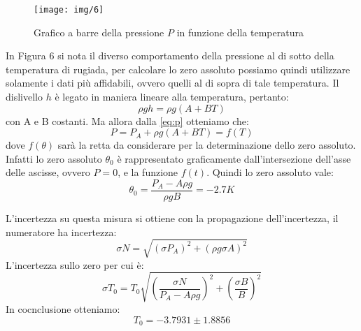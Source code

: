 \begin{figure}[H]
\centering
\texttt{[image: img/6]}
\caption{Grafico a barre della pressione $P$ in funzione della temperatura}
\end{figure}


In Figura 6 si nota il diverso comportamento della pressione al di sotto della temperatura di rugiada, per calcolare lo zero assoluto possiamo quindi utilizzare solamente i dati più affidabili, ovvero quelli al di sopra di tale temperatura.
Il dislivello $h$ è legato in maniera lineare alla temperatura, pertanto:
\begin{equation}
\rho gh = \rho g (A + B T)
\end{equation}
con A e B costanti.
Ma allora dalla \eqref{eq:p} otteniamo che:
\begin{equation}
P = P_A + \rho g (A + B T) = f (T)
\end{equation}
dove $f(\theta)$ sarà la retta da considerare per la determinazione dello zero assoluto.
Infatti lo zero assoluto $\theta_0$ è rappresentato graficamente dall'intersezione dell'asse delle ascisse, ovvero $P = 0$, e la funzione $f(t)$.
Quindi lo zero assoluto vale: 
\begin{equation}
\theta_0 = \frac{P_A - A \rho g}{\rho gB} = -2.7 K
\end{equation}

L'incertezza su questa misura si ottiene con la propagazione dell'incertezza, il numeratore ha incertezza:
\begin{equation}
\sigma N = \sqrt{(\sigma P_A)^2 + (\rho g \sigma A)^2}
\end{equation}
L'incertezza sullo zero per cui è:
\begin{equation}
\sigma T_0 = T_0\sqrt{\left(\frac{\sigma N}{P_A - A \rho g}\right)^2 +\left(\frac{\sigma B}{B}\right)^2 } 
\end{equation}
In cocnclusione otteniamo:
\[T_0 = -3.7931 \pm 1.8856 \]